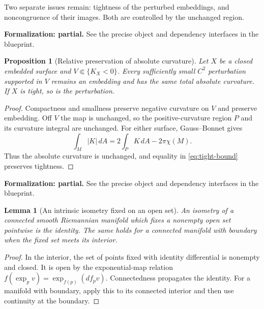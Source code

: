 \documentclass[11pt]{amsart}
\newtheorem{proposition}[theorem]{Proposition}
\newtheorem{lemma}[theorem]{Lemma}
\theoremstyle{definition}
\theoremstyle{remark}
\numberwithin{equation}{section}
\begin{document}
Two separate issues remain: tightness of the perturbed embeddings, and
noncongruence of their images. Both are controlled by the unchanged region.
\par\noindent\textbf{Formalization: partial.} See the precise object and dependency interfaces in the blueprint.\par
\begin{proposition}[Relative preservation of absolute curvature]\label{prop:budget}
Let $X$ be a closed embedded surface and $V\Subset\{K_X<0\}$.
Every sufficiently small $C^2$ perturbation supported in $V$ remains an
embedding and has the same total absolute curvature. If $X$ is tight,
so is the perturbation.
\end{proposition}
\begin{proof}
Compactness and smallness preserve negative curvature on $V$ and preserve
embedding. Off $V$ the map is unchanged, so the positive-curvature region
$P$ and its curvature integral are unchanged. For either surface,
Gauss--Bonnet gives
\[
 \int_M|K|\,dA=2\int_P K\,dA-2\pi\chi(M).
\]
Thus the absolute curvature is unchanged, and equality in
\eqref{eq:tight-bound} preserves tightness.
\end{proof}

\par\noindent\textbf{Formalization: partial.} See the precise object and dependency interfaces in the blueprint.\par
\begin{lemma}[An intrinsic isometry fixed on an open set]\label{lem:fixed-open}
An isometry of a connected smooth Riemannian manifold which fixes a
nonempty open set pointwise is the identity. The same holds for a connected
manifold with boundary when the fixed set meets its interior.
\end{lemma}
\begin{proof}
In the interior, the set of points fixed with identity differential is
nonempty and closed. It is open by the exponential-map relation
$f(\exp_pv)=\exp_{f(p)}(df_pv)$. Connectedness propagates the identity.
For a manifold with boundary, apply this to its connected interior and
then use continuity at the boundary.
\end{proof}
\end{document}
